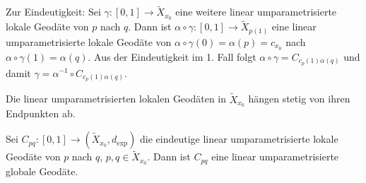 \begin{beweis}
\begin{description}
		Zur Eindeutigkeit:
		Sei $\gamma \colon [0,1] \rightarrow \tilde{X}_{x_0}$ eine weitere linear umparametrisierte lokale Geodäte von $p$ nach $q$.
		Dann ist $\alpha \circ \gamma \colon [0,1] \rightarrow \tilde{X}_{p(1)}$ eine linear umparametrisierte lokale Geodäte von $\alpha \circ \gamma(0) = \alpha(p) = c_{x_0}$ nach $\alpha \circ \gamma(1) = \alpha(q)$.
		Aus der Eindeutigkeit im 1. Fall folgt $\alpha \circ \gamma = C_{c_p(1)\alpha(q)}$ und damit $\gamma = \alpha^{-1} \circ C_{c_p(1)\alpha(q)}$. \qedhere
	\end{description}
\end{beweis}

\begin{lemma}
\label{lemma:2.39}
	Die linear umparametrisierten lokalen Geodäten in $\tilde{X}_{x_0}$ hängen stetig von ihren Endpunkten ab. 
\end{lemma}

\begin{lemma}
\label{lemma:2.40}
	Sei $C_{pq}\colon [0,1] \rightarrow (\tilde{X}_{x_0},d_{\exp})$ die eindeutige linear umparametrisierte lokale Geodäte von $p$ nach $q$, $p,q \in \tilde{X}_{x_0}$.
	Dann ist $C_{pq}$ eine linear umparametrisierte globale Geodäte.
\end{lemma}

